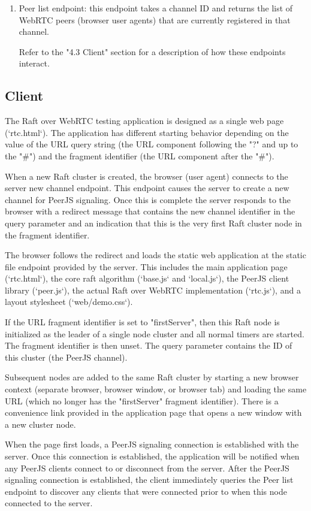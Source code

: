 \documentclass[9pt]{extarticle}
\begin{document}
\begin{multicols}{2}
\begin{enumerate}
\item Peer list endpoint: this endpoint takes a channel ID and returns the list of WebRTC peers (browser user agents) that are currently registered in that channel.

Refer to the "4.3 Client" section for a description of how these
endpoints interact.
\end{enumerate}

\subsection{Client}

The Raft over WebRTC testing application is designed as a single web
page (`rtc.html`). The application has different starting behavior
depending on the value of the URL query string (the URL component
following the "?" and up to the "\#") and the fragment identifier (the
URL component after the "\#").

When a new Raft cluster is created, the browser (user agent) connects
to the server new channel endpoint. This endpoint causes the server to
create a new channel for PeerJS signaling. Once this is complete the
server responds to the browser with a redirect message that contains
the new channel identifier in the query parameter and an indication
that this is the very first Raft cluster node in the fragment
identifier.

The browser follows the redirect and loads the static web application
at the static file endpoint provided by the server. This includes the
main application page (`rtc.html`), the core raft algorithm
(`base.js` and `local.js`), the PeerJS client library (`peer.js`), the
actual Raft over WebRTC implementation (`rtc.js`), and a layout
stylesheet (`web/demo.css`).

If the URL fragment identifier is set to "firstServer", then this Raft
node is initialized as the leader of a single node cluster and all
normal timers are started. The fragment identifier is then unset. The
query parameter contains the ID of this cluster (the PeerJS channel).

Subsequent nodes are added to the same Raft cluster by starting a new
browser context (separate browser, browser window, or browser tab) and
loading the same URL (which no longer has the "firstServer" fragment
identifier). There is a convenience link provided in the application
page that opens a new window with a new cluster node.

When the page first loads, a PeerJS signaling connection is
established with the server. Once this connection is established, the
application will be notified when any PeerJS clients connect to or
disconnect from the server. After the PeerJS signaling connection is
established, the client immediately queries the Peer list endpoint to
discover any clients that were connected prior to when this node
connected to the server.


\end{multicols}
\end{document}
